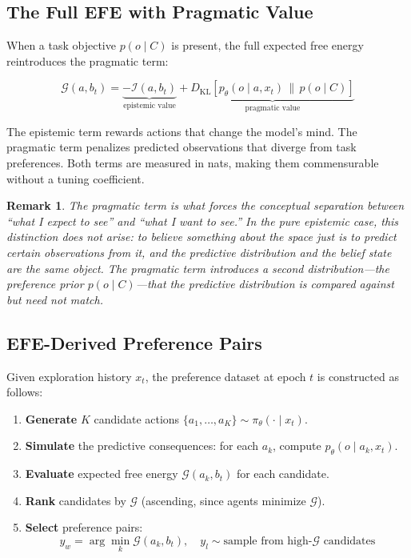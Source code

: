\documentclass[11pt]{article}
\newtheorem{remark}{Remark}
\newcommand{\EFE}{\mathcal{G}}
\newcommand{\KL}[2]{D_{\mathrm{KL}}\!\left[#1 \,\|\, #2\right]}
\begin{document}
\subsection{The Full EFE with Pragmatic Value}

When a task objective $p(o \mid C)$ is present, the full expected free energy reintroduces the pragmatic term:

\begin{equation}
\label{eq:efe-full}
\EFE(a, b_t) = \underbrace{-\mathcal{I}(a, b_t)}_{\text{epistemic value}} + \underbrace{\KL{p_\theta(o \mid a, x_t)}{p(o \mid C)}}_{\text{pragmatic value}}
\end{equation}

The epistemic term rewards actions that change the model's mind. The pragmatic term penalizes predicted observations that diverge from task preferences. Both terms are measured in nats, making them commensurable without a tuning coefficient.

\begin{remark}
\label{rem:pragmatic-separation}
The pragmatic term is what forces the conceptual separation between ``what I expect to see'' and ``what I want to see.'' In the pure epistemic case, this distinction does not arise: to believe something about the space just \emph{is} to predict certain observations from it, and the predictive distribution and the belief state are the same object. The pragmatic term introduces a second distribution---the preference prior $p(o \mid C)$---that the predictive distribution is compared against but need not match.
\end{remark}


\subsection{EFE-Derived Preference Pairs}
\label{sec:efe-pairs}

Given exploration history $x_t$, the preference dataset at epoch $t$ is constructed as follows:

\begin{enumerate}
    \item \textbf{Generate} $K$ candidate actions $\{a_1, \ldots, a_K\} \sim \pi_\theta(\cdot \mid x_t)$.
    \item \textbf{Simulate} the predictive consequences: for each $a_k$, compute $p_\theta(o \mid a_k, x_t)$.
    \item \textbf{Evaluate} expected free energy $\EFE(a_k, b_t)$ for each candidate.
    \item \textbf{Rank} candidates by $\EFE$ (ascending, since agents minimize $\EFE$).
    \item \textbf{Select} preference pairs:
    \begin{equation}
    \label{eq:pair-selection}
    y_w = \arg\min_k \EFE(a_k, b_t), \quad y_l \sim \text{sample from high-}\EFE \text{ candidates}
    \end{equation}
\end{enumerate}
\end{document}
